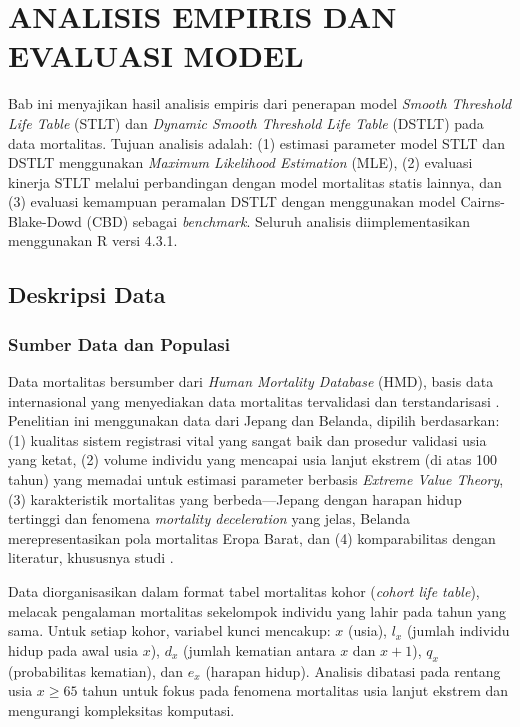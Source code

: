 \chapter{ANALISIS EMPIRIS DAN EVALUASI MODEL}

Bab ini menyajikan hasil analisis empiris dari penerapan model \textit{Smooth Threshold Life Table} (STLT) dan \textit{Dynamic Smooth Threshold Life Table} (DSTLT) pada data mortalitas. Tujuan analisis adalah: (1) estimasi parameter model STLT dan DSTLT menggunakan \textit{Maximum Likelihood Estimation} (MLE), (2) evaluasi kinerja STLT melalui perbandingan dengan model mortalitas statis lainnya, dan (3) evaluasi kemampuan peramalan DSTLT dengan menggunakan model Cairns-Blake-Dowd (CBD) sebagai \textit{benchmark}. Seluruh analisis diimplementasikan menggunakan R versi 4.3.1.

\section{Deskripsi Data}

\subsection{Sumber Data dan Populasi}

Data mortalitas bersumber dari \textit{Human Mortality Database} (HMD), basis data internasional yang menyediakan data mortalitas tervalidasi dan terstandarisasi \citep{HMD2023}. Penelitian ini menggunakan data dari Jepang dan Belanda, dipilih berdasarkan: (1) kualitas sistem registrasi vital yang sangat baik dan prosedur validasi usia yang ketat, (2) volume individu yang mencapai usia lanjut ekstrem (di atas 100 tahun) yang memadai untuk estimasi parameter berbasis \textit{Extreme Value Theory}, (3) karakteristik mortalitas yang berbeda—Jepang dengan harapan hidup tertinggi dan fenomena \textit{mortality deceleration} yang jelas, Belanda merepresentasikan pola mortalitas Eropa Barat, dan (4) komparabilitas dengan literatur, khususnya studi \citet{huang2020modelling}.

Data diorganisasikan dalam format tabel mortalitas kohor (\textit{cohort life table}), melacak pengalaman mortalitas sekelompok individu yang lahir pada tahun yang sama. Untuk setiap kohor, variabel kunci mencakup: $x$ (usia), $l_{x}$ (jumlah individu hidup pada awal usia $x$), $d_{x}$ (jumlah kematian antara $x$ dan $x+1$), $q_{x}$ (probabilitas kematian), dan $e_{x}$ (harapan hidup). Analisis dibatasi pada rentang usia $x \geq 65$ tahun untuk fokus pada fenomena mortalitas usia lanjut ekstrem dan mengurangi kompleksitas komputasi.

